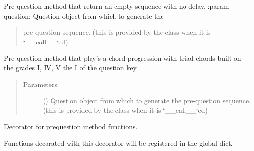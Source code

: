 \documentclass[letterpaper,10pt,english]{sphinxmanual}
\begin{document}

\begin{fulllineitems}
\label{\detokenize{birdears:birdears.prequestion.none}}
Pre-question method that return an empty sequence with no delay.
:param question: Question object from which to generate the
\begin{quote}

pre-question sequence. (this is provided by the  class
when it is {\color{red}\bfseries{}{}`}\_\_call\_\_{}`ed)
\end{quote}
\begin{quote}\begin{description}
\end{description}\end{quote}

\end{fulllineitems}


\begin{fulllineitems}
\label{\detokenize{birdears:birdears.prequestion.progression_i_iv_v_i}}
Pre-question method that play’s a chord progression with triad chords built
on the grades I, IV, V the I of the question key.
\begin{quote}\begin{description}
\item[{Parameters}] \leavevmode
{} () \textendash{} Question object from which to generate the
pre-question sequence. (this is provided by the  class
when it is {\color{red}\bfseries{}{}`}\_\_call\_\_{}`ed)

\end{description}\end{quote}

\end{fulllineitems}


\begin{fulllineitems}
\label{\detokenize{birdears:birdears.prequestion.register_prequestion_method}}
Decorator for prequestion method functions.

Functions decorated with this decorator will be registered in the
 global dict.

\end{fulllineitems}
\end{document}
